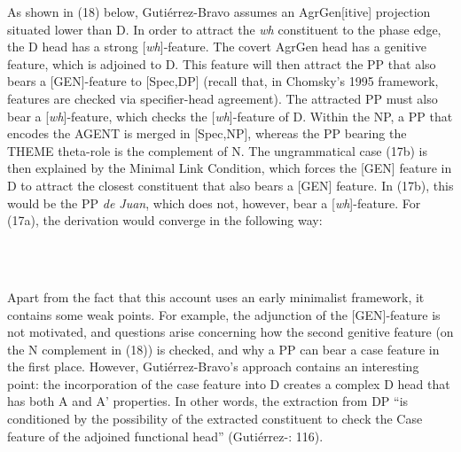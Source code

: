 \documentclass[output=paper]{langsci/langscibook}
\begin{document}
As shown in (18) below, Gutiérrez-Bravo assumes an AgrGen[itive] projection situated lower than D. In order to attract the \textit{wh} constituent to the phase edge, the D head has a strong [\textit{wh}]-feature. The covert AgrGen head has a genitive feature, which is adjoined to D. This feature will then attract the PP that also bears a [GEN]-feature to [Spec,DP] (recall that, in Chomsky’s 1995 framework, features are checked via specifier-head agreement). The attracted PP must also bear a [\textit{wh}]-feature, which checks the [\textit{wh}]-feature of D. Within the NP, a PP that encodes the AGENT is merged in [Spec,NP], whereas the PP bearing the THEME theta-role is the complement of N. The ungrammatical case (17b) is then explained by the Minimal Link Condition, which forces the [GEN] feature in D to attract the closest constituent that also bears a [GEN] feature. In (17b), this would be the PP \textit{de Juan}, which does not, however, bear a [\textit{wh}]-feature. For (17a), the derivation would converge in the following way:

    
 

\begin{styleFramecontents}
\ea%
    \label{ex:key:18}
    \gll\\
        \\
    \glt
    \z

        
\end{styleFramecontents}

Apart from the fact that this account uses an early minimalist framework, it contains some weak points. For example, the adjunction of the [GEN]-feature is not motivated, and questions arise concerning how the second genitive feature (on the N complement in (18)) is checked, and why a PP can bear a case feature in the first place. However, Gutiérrez-Bravo’s approach contains an interesting point: the incorporation of the case feature into D creates a complex D head that has both A and A’ properties. In other words, the extraction from DP “is conditioned by the possibility of the extracted constituent to check the Case feature of the adjoined functional head” (Gutiérrez-\citealt{Bravo2001}: 116).
\end{document}
